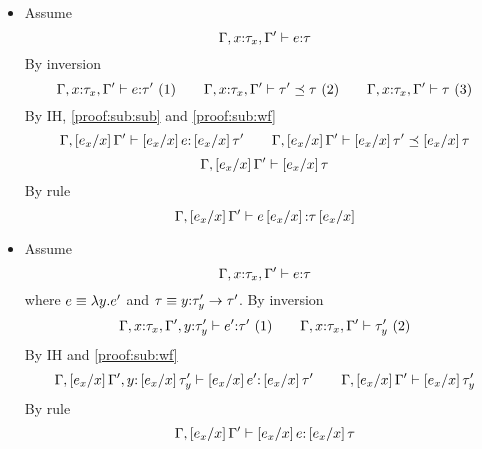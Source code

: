 \begin{enumerate}
\begin{itemize}
\item\rtsub
Assume 
	$$\hastype{\Gamma, x\colon\tau_x, \Gamma'}{e}{\tau}$$
By inversion
$$
\hastype{\Gamma, x\colon\tau_x, \Gamma'}{e}{\tau'}\ (1)\qquad
\issubtype{\Gamma, x\colon\tau_x, \Gamma'}{\tau'}{\tau} \ (2)\qquad
\iswellformed{\Gamma, x\colon\tau_x, \Gamma'}{\tau} \ (3)
$$
By IH, \ref{proof:sub:sub} and \ref{proof:sub:wf}
$$
\hastype{\Gamma, \sub{x}{e_x}\Gamma'}{\sub{x}{e_x}e}{\sub{x}{e_x}\tau'}\qquad
\issubtype{\Gamma, \sub{x}{e_x}\Gamma'}{\sub{x}{e_x}\tau'}{\sub{x}{e_x}\tau}
$$
$$
\iswellformed{\Gamma, \sub{x}{e_x}\Gamma'}{\sub{x}{e_x}\tau}
$$
By rule \rtsub
$$\hastype{\Gamma,\sub{x}{e_x}\Gamma'}{e\sub{x}{e_x}}{\tau\sub{x}{e_x}}$$
\item\rtfun
Assume
	$$\hastype{\Gamma, x\colon\tau_x, \Gamma'}{e}{\tau}$$
where $e\equiv\efun{y}{e'}$ and $\tau\equiv\tfun{y}{\tau'_y}{\tau'}$.
By inversion
	$$
	\hastype{\Gamma, x\colon\tau_x, \Gamma', y\colon\tau'_y}{e'}{\tau'}\ (1)\qquad
	\iswellformed{\Gamma, x\colon\tau_x, \Gamma'}{\tau'_y}\ (2)
	$$
By IH and \ref{proof:sub:wf}
	$$
	\hastype{\Gamma,\sub{x}{e_x} \Gamma', y\colon\sub{x}{e_x}\tau'_y}{\sub{x}{e_x}e'}{\sub{x}{e_x}\tau'} \qquad
	\iswellformed{\Gamma, \sub{x}{e_x}\Gamma'}{\sub{x}{e_x}\tau'_y}
	$$
	By rule \rtfun
	$$
	\hastype{\Gamma,\sub{x}{e_x} \Gamma'}{\sub{x}{e_x}e}{\sub{x}{e_x}\tau}
	$$
	

\end{itemize}
\end{enumerate}
